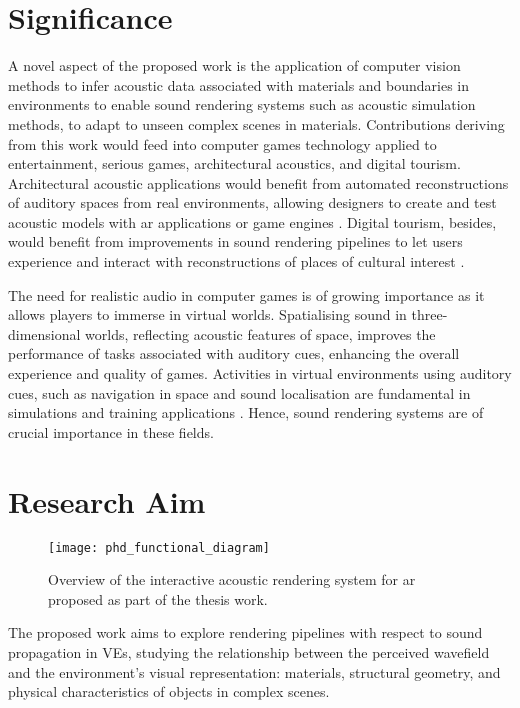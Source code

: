 \section{Significance}
A novel aspect of the proposed work is the application of computer vision methods to infer acoustic data associated with materials and boundaries in environments to enable sound rendering systems such as acoustic simulation methods, to adapt to unseen complex scenes in materials.
Contributions deriving from this work would feed into computer games technology applied to entertainment, serious games, architectural acoustics, and digital tourism. Architectural acoustic applications would benefit from automated reconstructions of auditory spaces from real environments, allowing designers to create and test acoustic models with \acrshort{ar} applications or game engines \citep{berardi2016acoustic}. Digital tourism, besides, would benefit from improvements in sound rendering pipelines to let users experience and interact with reconstructions of places of cultural interest \citep{schofield2018viking}.\par
The need for realistic audio in computer games is of growing importance as it allows players to immerse in virtual worlds. Spatialising sound in three-dimensional worlds, reflecting acoustic features of space, improves the performance of tasks associated with auditory cues, enhancing the overall experience and quality of games. 
Activities in virtual environments using auditory cues, such as navigation in space and sound localisation are fundamental in simulations and training applications \citep{lokki2005navigation}. Hence, sound rendering systems are of crucial importance in these fields.

\section{Research Aim}
\begin{figure}[htbp]
    \centering
    \texttt{[image: phd\_functional\_diagram]}
    \caption[Proposed pipeline schematic overview]{Overview of the interactive acoustic rendering system for \acrshort{ar} proposed as part of the thesis work.}
    \label{fig:proposed-system-diagram}
\end{figure}
The proposed work aims to explore rendering pipelines with respect to sound propagation in VEs, studying the relationship between the perceived wavefield and the environment’s visual representation: materials, structural geometry, and physical characteristics of objects in complex scenes.


